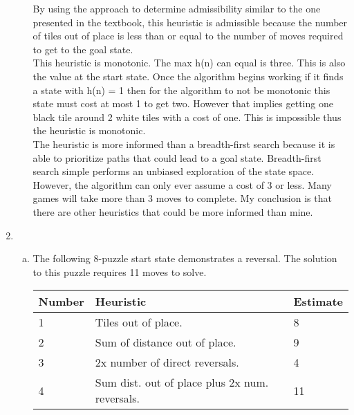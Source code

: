\documentclass[11pt]{article}
\begin{document}
\begin{enumerate}[1.]
\begin{enumerate}[a.]
  By using the approach to determine admissibility similar to the one presented in the textbook, this heuristic is admissible because the number of tiles out of place is less than or equal to the number of moves required to get to the goal state.\\
  
  This heuristic is monotonic. The max h(n) can equal is three. This is also the value at the start state. Once the algorithm begins working if it finds a state with h(n) = 1 then for the algorithm to not be monotonic this state must cost at most 1 to get two. However that implies getting one black tile around 2 white tiles with a cost of one. This is impossible thus the heuristic is monotonic. \\
  
  The heuristic is more informed than a breadth-first search because it is able to prioritize paths that could lead to a goal state. Breadth-first search simple performs an unbiased exploration of the state space. However, the algorithm can only ever assume a cost of 3 or less. Many games will take more than 3 moves to complete. My conclusion is that there are other heuristics that could be more informed than mine.\\
  \end{enumerate}

\item
  \begin{enumerate}[a.]
  \item The following 8-puzzle start state demonstrates a reversal. The solution to this puzzle requires 11 moves to solve.

\begin{figure}[htbp]
    \centering
{}
\end{figure}


\begin{center} 
\begin{tabular}{| l | l | l |} 
\hline Number & \textbf{Heuristic} & \textbf{Estimate}\\
\hline 1 & Tiles out of place. & 8\\ 
\hline 2 & Sum of distance out of place. &  9\\ 
\hline 3 & 2x number of direct reversals. & 4  \\ 
\hline 4 & Sum dist. out of place plus 2x num. reversals. & 11 \\
\hline 
\end{tabular} 
\end{center} 


\end{enumerate}
\end{enumerate}
\end{document}
